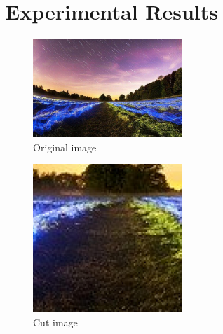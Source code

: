 \section{Experimental Results}
\begin{figure}[h]
    \centering
    \includegraphics[width=0.5\textwidth]{img/start/sample640x426.jpg}
    \caption{Original image}
\end{figure}

\begin{figure}[h]
    \centering
    \includegraphics[width=0.5\textwidth]{img/start/selectedZoneCutout.jpg}
    \caption{Cut image}
\end{figure}